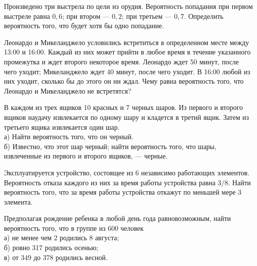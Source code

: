 \newpage\setcounter{zad}{0}



\begin{zkrW}{20}\noindent 
	Произведено три выстрела по цели из орудия. Вероятность попадания при первом выстреле равна $0{,}6$; при втором --- $0{,}2$; при третьем --- $0{,}7$. Определить вероятность того, что будет хотя бы одно попадание.
 
\end{zkrW}

\begin{zkrW}{20}\noindent 
	Леонардо и Микеланджело условились встретиться в определенном месте между 13:00 и 16:00. Каждый из них может прийти в любое время в течение указанного промежутка и ждет второго некоторое время. Леонардо ждет 50 минут, после чего уходит; Микеланджело ждет 40 минут, после чего уходит. В 16:00 любой из них уходит, сколько бы до этого он ни ждал. Чему равна вероятность того, что Леонардо и Микеланджело не встретятся?
 
\end{zkrW}

\begin{zkrW}{20}\noindent 
	В каждом из трех ящиков 10 красных и 7 черных шаров. Из первого и второго ящиков наудачу извлекается по одному шару и кладется в третий ящик. Затем из третьего ящика извлекается один шар. \\ \indent а) Найти вероятность того, что он черный. \\ \indent б) Известно, что этот шар черный; найти вероятность того, что шары, извлеченные из первого и второго ящиков, --- черные.
 
\end{zkrW}

\begin{zkrW}{20}\noindent 
	Эксплуатируется устройство, состоящее из 6 независимо работающих элементов. Вероятность отказа каждого из них за время работы устройства равна $3/8$. Найти вероятность того, что за время работы устройства откажут по меньшей мере 3 элемента.
 
\end{zkrW}

\begin{zkrW}{20}\noindent 
	Предполагая рождение ребенка в любой день года равновозможным, найти вероятность того, что в группе из 600 человек \\ \indent а) не менее чем 2 родились 8 августа; \\ \indent б) ровно 317 родились осенью; \\ \indent в) от 349 до 378 родились весной.
 
\end{zkrW}

